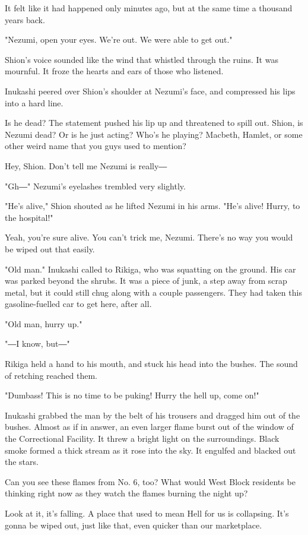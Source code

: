 It felt like it had happened only minutes ago, but at the same time a
thousand years back.

"Nezumi, open your eyes. We're out. We were able to get out."

Shion's voice sounded like the wind that whistled through the ruins. It
was mournful. It froze the hearts and ears of those who listened.

Inukashi peered over Shion's shoulder at Nezumi's face, and compressed
his lips into a hard line.

Is he dead? The statement pushed his lip up and threatened to spill out.
Shion, is Nezumi dead? Or is he just acting? Who's he playing? Macbeth,
Hamlet, or some other weird name that you guys used to mention?

Hey, Shion. Don't tell me Nezumi is really―

"Gh―" Nezumi's eyelashes trembled very slightly.

"He's alive," Shion shouted as he lifted Nezumi in his arms. "He's
alive! Hurry, to the hospital!"

Yeah, you're sure alive. You can't trick me, Nezumi. There's no way you
would be wiped out that easily.

"Old man." Inukashi called to Rikiga, who was squatting on the ground.
His car was parked beyond the shrubs. It was a piece of junk, a step
away from scrap metal, but it could still chug along with a couple
passengers. They had taken this gasoline-fuelled car to get here, after
all.

"Old man, hurry up."

"―I know, but―"

Rikiga held a hand to his mouth, and stuck his head into the bushes. The
sound of retching reached them.

"Dumbass! This is no time to be puking! Hurry the hell up, come on!"

Inukashi grabbed the man by the belt of his trousers and dragged him out
of the bushes. Almost as if in answer, an even larger flame burst out of
the window of the Correctional Facility. It threw a bright light on the
surroundings. Black smoke formed a thick stream as it rose into the sky.
It engulfed and blacked out the stars.

Can you see these flames from No. 6, too? What would West Block
residents be thinking right now as they watch the flames burning the
night up?

Look at it, it's falling. A place that used to mean Hell for us is
collapsing. It's gonna be wiped out, just like that, even quicker than
our marketplace.

